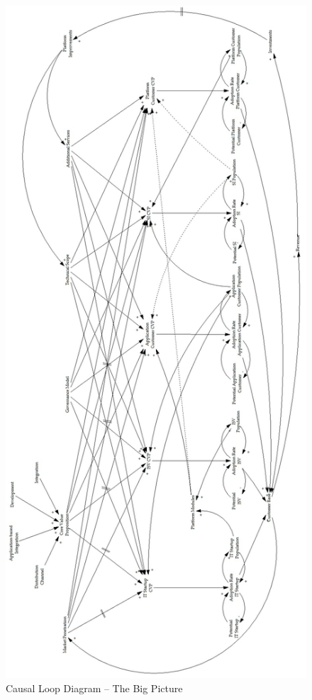 \begin{figure}[tb]
	\centering
	\includegraphics[height=0.95\textheight]{gfx/cld_bigPicture}
	\caption{Causal Loop Diagram -- The Big Picture}
	\label{fig:cld_bp}
\end{figure}

